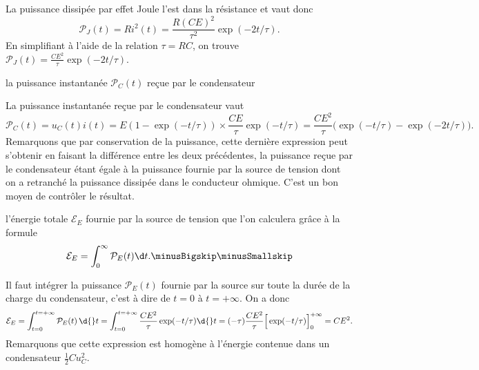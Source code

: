 
\begin{corrige}
La puissance dissipée par effet Joule l'est dans la résistance et vaut donc 
\[
\mathcal{P}_J(t)=Ri^2(t)=\frac{R(CE)^2}{\tau^2}\exp(-2t/\tau).
\]
En simplifiant à l'aide de la relation $\tau=RC$, on trouve $\mathcal{P}_J(t)=\frac{CE^2}{\tau}\exp(-2t/\tau)$.
\end{corrige}




\begin{enonce}
la puissance instantanée $\mathcal{P}_C(t)$ reçue par le condensateur
\end{enonce}


\begin{corrige}
La puissance instantanée reçue par le condensateur vaut 
\[
\mathcal{P}_C(t)
= u_C(t)i(t)=E(1-\exp(-t/\tau)) \times \frac{CE}{\tau}\exp(-t/\tau)
= \frac{CE^2}{\tau}\Big(\exp(-t/\tau)-\exp(-2t/\tau)\Big).
\]
Remarquons que par conservation de la puissance, cette dernière expression peut s'obtenir en faisant la différence entre les deux précédentes, la puissance reçue par le condensateur étant égale à la puissance fournie par la source de tension dont on a retranché la puissance dissipée dans le conducteur ohmique. C'est un bon moyen de contrôler le résultat.
\end{corrige}





\begin{enonce}
l'énergie totale $\mathcal{E}_E$ fournie par la source de tension que l'on calculera grâce à la formule \minusSmallskip
\[
\mathcal{E}_E = \int_0^\infty  \mathcal{P}_E(t) \d t.\minusBigskip\minusSmallskip
\]
\end{enonce}


\begin{corrige}
Il faut intégrer la puissance $\mathcal{P}_E(t)$ fournie par la source sur toute la durée de la charge du condensateur, c'est à dire de $t=0$ à $t=+\infty$. On a donc
\[
\mathcal{E}_E=\int_{t=0}^{t=+\infty} \mathcal{P}_E(t) \, \d{}t = \int_{t=0}^{t=+\infty} \frac{CE^2}{\tau}\exp(-t/\tau) \d{}t = (-\tau) \frac{CE^2}{\tau} \Big[\exp(-t/\tau)\Big]_0^{+\infty}= CE^2.
\]
Remarquons que cette expression est homogène à l'énergie contenue dans un condensateur $\frac{1}{2}Cu_C^2$.
\end{corrige}

